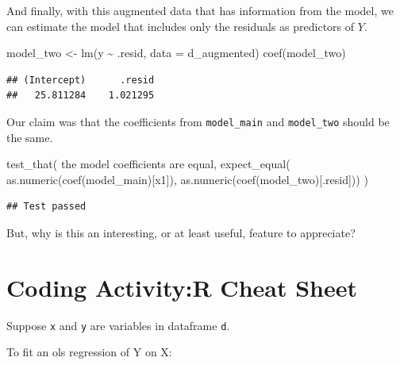 \documentclass[
]{book}
\newenvironment{Shaded}{\begin{snugshade}}{\end{snugshade}}
\newcommand{\AttributeTok}[1]{\textcolor[rgb]{0.77,0.63,0.00}{#1}}
\newcommand{\FunctionTok}[1]{\textcolor[rgb]{0.00,0.00,0.00}{#1}}
\newcommand{\NormalTok}[1]{#1}
\newcommand{\OtherTok}[1]{\textcolor[rgb]{0.56,0.35,0.01}{#1}}
\newcommand{\SpecialCharTok}[1]{\textcolor[rgb]{0.00,0.00,0.00}{#1}}
\newcommand{\StringTok}[1]{\textcolor[rgb]{0.31,0.60,0.02}{#1}}
\theoremstyle{definition}
\theoremstyle{definition}
\theoremstyle{definition}
\theoremstyle{definition}
\theoremstyle{remark}
\begin{document}
And finally, with this augmented data that has information from the model, we can estimate the model that includes only the residuals as predictors of \(Y\).

\begin{Shaded}
\begin{Highlighting}[]
\NormalTok{model\_two }\OtherTok{\textless{}{-}} \FunctionTok{lm}\NormalTok{(y }\SpecialCharTok{\textasciitilde{}}\NormalTok{ .resid, }\AttributeTok{data =}\NormalTok{ d\_augmented)}
\FunctionTok{coef}\NormalTok{(model\_two)}
\end{Highlighting}
\end{Shaded}

\begin{verbatim}
## (Intercept)      .resid 
##   25.811284    1.021295
\end{verbatim}

Our claim was that the coefficients from \texttt{model\_main} and \texttt{model\_two} should be the same.

\begin{Shaded}
\begin{Highlighting}[]
\FunctionTok{test\_that}\NormalTok{(}
  \StringTok{\textquotesingle{}the model coefficients are equal\textquotesingle{}}\NormalTok{, }
  \FunctionTok{expect\_equal}\NormalTok{(}
    \FunctionTok{as.numeric}\NormalTok{(}\FunctionTok{coef}\NormalTok{(model\_main)[}\StringTok{\textquotesingle{}x1\textquotesingle{}}\NormalTok{]), }
    \FunctionTok{as.numeric}\NormalTok{(}\FunctionTok{coef}\NormalTok{(model\_two)[}\StringTok{\textquotesingle{}.resid\textquotesingle{}}\NormalTok{]))}
\NormalTok{)}
\end{Highlighting}
\end{Shaded}

\begin{verbatim}
## Test passed
\end{verbatim}

But, why is this an interesting, or at least useful, feature to appreciate?

\hypertarget{coding-activityr-cheat-sheet}{%
\section{Coding Activity:R Cheat Sheet}\label{coding-activityr-cheat-sheet}}

Suppose \texttt{x} and \texttt{y} are variables in dataframe \texttt{d}.

To fit an ols regression of Y on X:
\end{document}
